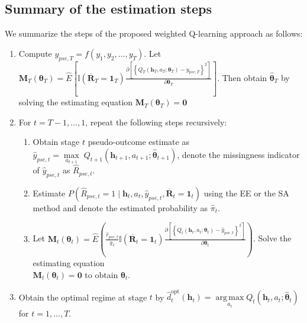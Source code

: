 \documentclass[12pt]{article}
\DeclareMathOperator*{\argmax}{arg\,max}
\begin{document}
\subsection{Summary of the estimation steps}\label{steps}
We summarize the steps of the proposed weighted Q-learning approach as follows: 


\begin{enumerate}
    \item  Compute $y_{pse,T} = f(y_{1},y_{2}, \ldots, y_{T})$. Let $\bm{M}_T(\bm{\theta}_T) =\widehat{E}\left[ \mathbb{I}(\overline{\bm{R}}_{T}=\bm{1}_T) \frac{\partial \left[ \left\{  
  Q_T(\bm{h}_T,a_T;\bm{\theta}_T) - y_{pse,T}\right\} ^2\right]}{\partial \bm{\theta}_T} \right]$. Then obtain $\widehat{\bm{\theta}}_T$ by solving the estimating equation $\bm{M}_T(\bm{\theta}_T) = \bm{0}$
    \item  For $t = T-1,\ldots, 1$, repeat the following steps recursively:
    \begin{enumerate}
        \item Obtain stage $t$ pseudo-outcome estimate as $\widehat{y}_{pse,t} = \max\limits_{a_{t+1}} \; Q_{t+1}(\bm{h}_{t+1},a_{t+1};\widehat{\bm{\theta}}_{t+1})  $, denote the
        missingness indicator of $\widehat{y}_{pse,t}$ as $\widehat{R}_{pse,t}$.
        \item Estimate $P(\widehat{R}_{pse,t}=1\mid \bm{h}_t,a_t, \widehat{y}_{pse,t}, \overline{\bm{R}}_t=\bm{1}_t)$  using the EE or the SA method and  denote the estimated probability as $\widehat{\pi}_t$.%
        \item Let $\bm{M}_t(\bm{\theta}_t) = \widehat{E} \left(\frac{\widehat{r}_{pse,t}}{\widehat{\pi}_{t}} \mathbb{I}(\overline{\bm{R}}_{t}=\bm{1}_t) \frac{\partial \left[ \left\{ Q_t(\bm{h}_t,a_t;\bm{\theta}_t) - \widehat{y}_{pse,t}  \right\}^2\right]}{\partial \bm{\theta}_t} \right)$. Solve the estimating equation \\$\bm{M}_t(\bm{\theta}_t) = \bm{0}$ to obtain $\widehat{\bm{\theta}}_t$.
    \end{enumerate}
    \item  Obtain the optimal  regime at stage $t$  by $\widehat{d}_t^{\mathrm{opt}}\left(\bm{h}_t\right) =  \argmax\limits_{a_t}Q_t(\bm{h}_t,a_t;\widehat{\bm{\theta}}_t)$ for $t=1,\ldots,T$. 
\end{enumerate}
\end{document}
